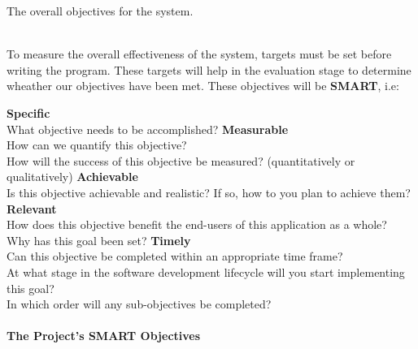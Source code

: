 \documentclass[../../../main.tex]{subfiles}
\begin{document}
\noindent The overall objectives for the system.

\noindent \\ To measure the overall effectiveness of the system, targets must be set before writing the program.
These targets will help in the evaluation stage to determine wheather our objectives have been met.
These objectives will be \textbf{SMART}, i.e:

\begin{outline}
      \1 \textbf{Specific}\\
      What objective needs to be accomplished?
      \1 \textbf{Measurable}\\
      How can we quantify this objective?\\
      How will the success of this objective be measured? (quantitatively or qualitatively)
      \1 \textbf{Achievable}\\
      Is this objective achievable and realistic? If so, how to you plan to achieve them?
      \1 \textbf{Relevant}\\
      How does this objective benefit the end-users of this application as a whole?\\
      Why has this goal been set?
      \1 \textbf{Timely}\\
      Can this objective be completed within an appropriate time frame?\\
      At what stage in the software development lifecycle will you start implementing this goal?\\
      In which order will any sub-objectives be completed?
\end{outline}

\paragraph{The Project's SMART Objectives}
\end{document}
